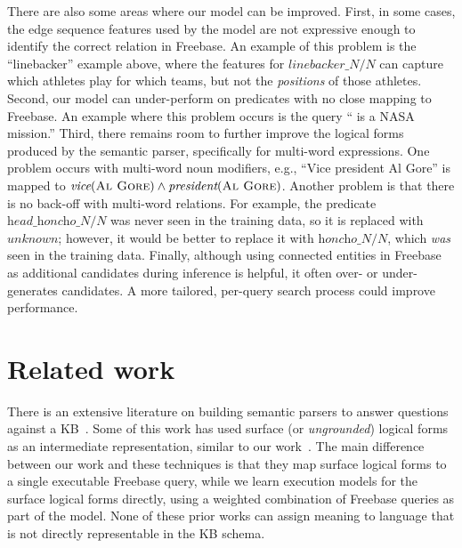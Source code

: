 \documentclass[11pt,letterpaper]{article}
\newcommand{\blank}{\underline{\hspace{.5cm}}}
\newcommand{\lexicalpredicate}[1]{\ensuremath{\textit{#1}}}
\newcommand{\entity}[1]{\ensuremath{\textsc{#1}}}
\begin{document}
There are also some areas where our model can be improved. First, in some cases, the edge sequence
features used by the model are not expressive enough to identify the correct relation in Freebase.
An example of this problem is the ``linebacker'' example above, where the features for
\lexicalpredicate{linebacker\_N/N} can capture which athletes play for which teams, but not the
\emph{positions} of those athletes. Second, our model can under-perform on predicates with no close
mapping to Freebase. An example where this problem occurs is the query ``\blank{} is a NASA
mission.'' Third, there remains room to further improve the logical forms produced by the semantic
parser, specifically for multi-word expressions. One problem occurs with multi-word noun modifiers,
e.g., ``Vice president Al Gore'' is mapped to $\lexicalpredicate{vice}(\entity{Al Gore}) \land
\lexicalpredicate{president}(\entity{Al Gore})$. Another problem is that there is no back-off with
multi-word relations. For example, the predicate \lexicalpredicate{head\_honcho\_N/N} was never
seen in the training data, so it is replaced with \lexicalpredicate{unknown}; however, it would be
better to replace it with \lexicalpredicate{honcho\_N/N}, which \emph{was} seen in the training
data. Finally, although using connected entities in Freebase as additional candidates during
inference is helpful, it often over- or under-generates candidates. A more tailored, per-query
search process could improve performance.

\vspace{-2.00mm}
\section{Related work}

There is an extensive literature on building semantic parsers to answer questions against a
KB~\cite{zettlemoyer-2005-ccg,berant-2013-semantic-parsing-qa,%
krishnamurthy-2012-semantic-parsing,li-2015-semantic-parsing-scfg}.  Some of this work has used
surface (or \emph{ungrounded}) logical forms as an intermediate representation, similar to our
work~\cite{kwiatkowski-2013-ontology-matching,reddy-2014-graph-matching,%
yih-2015-semparse-query-graph,reddy-2016-dep-lambda}.  The main difference between our work and
these techniques is that they map surface logical forms to a single executable Freebase query,
while we learn execution models for the surface logical forms directly, using a weighted
combination of Freebase queries as part of the model.  None of these prior works can assign meaning
to language that is not directly representable in the KB schema.
\end{document}
